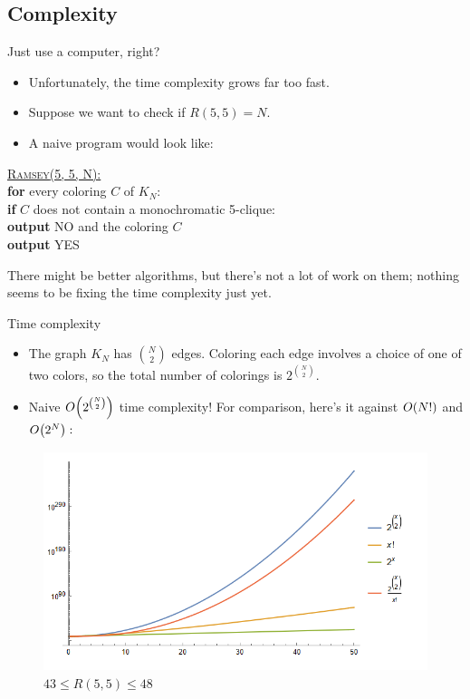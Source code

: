 \documentclass[aspectratio=169]{beamer}
\begin{document}
\subsection{Complexity} %
\begin{frame}{Just use a computer, right?}
    \begin{itemize}
        \item Unfortunately, the time complexity grows far too fast. 
        \item Suppose we want to check if $R(5, 5) = N.$ 
        \item A naive program would look like:
    \end{itemize}
    \begin{algo}
        \underline{\textsc{Ramsey}(5, 5, N):}\+
    \\      \textbf{for} every coloring $C$ of $K_N$:\+
    \\          \textbf{if} $C$ does not contain a monochromatic 5-clique:\+
    \\              \textbf{output} \textsc{NO} and the coloring $C$\-\-
    \\      \textbf{output} \textsc{YES}
    \end{algo}
    There might be better algorithms\cite{site:stackexchange}, but there's not a lot of work on them; nothing seems to be fixing the time complexity just yet.
\end{frame}

\begin{frame}{Time complexity}
    \begin{itemize}
        \item The graph $K_N$ has $N \choose 2$ edges. Coloring each edge involves a choice of one of two colors, so the total number of colorings is $2^{N \choose 2}$. \pause
        \item Naive $O\pqty{2^{N \choose 2}}$ time complexity! For comparison, here's it against $O\pqty{N!}$ and $O\pqty{2^N}:$ \pause
    \end{itemize}
    \begin{figure}
        \centering
        \includegraphics[width=0.6\columnwidth]{images/complexitycompairson.png} %
        \caption{$43 \leq R(5,5) \leq 48$}
    \end{figure}
\end{frame}
\end{document}
